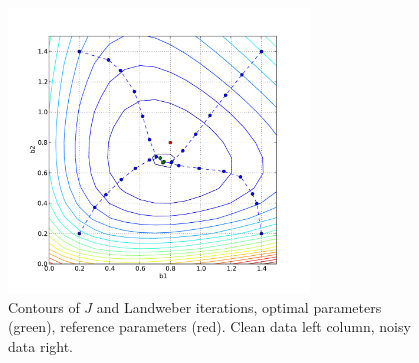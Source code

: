 \begin{figure}
\begin{center}
    \includegraphics[width=8cm]{chapters/schroll/pdf/b1b2scan4-5.pdf}
    \caption{Contours of $J$ and Landweber iterations, optimal parameters (green), reference parameters (red).
      Clean data left column, noisy data right.}
    \label{fig2}
  \end{center}
\end{figure}

